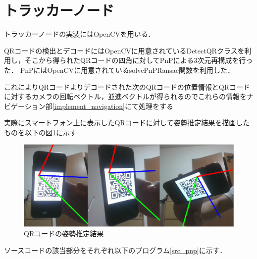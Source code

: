 \section{トラッカーノード}
\label{implement_tracker}
トラッカーノードの実装にはOpenCVを用いる．

QRコードの検出とデコードにはOpenCVに用意されているDetectQRクラスを利用し，そこから得られたQRコードの四角に対してPnPによる3次元再構成を行った．
PnPにはOpenCVに用意されているsolvePnPRansac関数を利用した．

これによりQRコードよりデコードされた次のQRコードの位置情報とQRコードに対するカメラの回転ベクトル，並進ベクトルが得られるのでこれらの情報をナビゲーション部\ref{implement_navigation}にて処理をする

実際にスマートフォン上に表示したQRコードに対して姿勢推定結果を描画したものを以下の図\ref{pnp_qr_img}に示す

\begin{figure}[htbp]
  \begin{center}
    \includegraphics[clip,width=15.0cm]{img/pnp_qr.png}
    \caption{QRコードの姿勢推定結果}
    \label{pnp_qr_img}
  \end{center}
\end{figure}

ソースコードの該当部分をそれぞれ以下のプログラム\ref{src_pnp}に示す．

